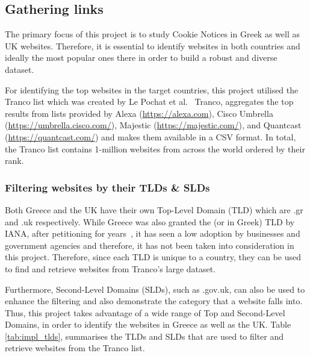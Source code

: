 \documentclass[../main.tex]{subfiles}
\begin{document}
\subsection{Gathering links}
The primary focus of this project is to study Cookie Notices in Greek as well as UK websites. Therefore, it is essential to identify websites in both countries and ideally the most popular ones there in order to build a robust and diverse dataset.

For identifying the top websites in the target countries, this project utilised the Tranco list which was created by Le Pochat et al.~\cite{LePochat2019} Tranco, aggregates the top results from lists provided by Alexa (\url{https://alexa.com}), Cisco Umbrella (\url{https://umbrella.cisco.com/}), Majestic (\url{https://majestic.com/}), and Quantcast (\url{https://quantcast.com/}) and makes them available in a CSV format. In total, the Tranco list contains 1-million websites from across the world ordered by their rank.

\subsubsection{Filtering websites by their TLDs \& SLDs}
Both Greece and the UK have their own Top-Level Domain (TLD) which are .gr and .uk respectively. While Greece was also granted the  (or  in Greek) TLD by IANA, after petitioning for years~\cite{iana_el}, it has seen a low adoption by businesses and government agencies and therefore, it has not been taken into consideration in this project. Therefore, since each TLD is unique to a country, they can be used to find and retrieve websites from Tranco’s large dataset. 

Furthermore, Second-Level Domains (SLDs), such as .gov.uk, can also be used to enhance the filtering and also demonstrate the category that a website falls into. Thus, this project takes advantage of a wide range of Top and Second-Level Domains, in order to identify the websites in Greece as well as the UK. Table \ref{tab:impl_tlds}, summarises the TLDs and SLDs that are used to filter and retrieve websites from the Tranco list.
\end{document}
